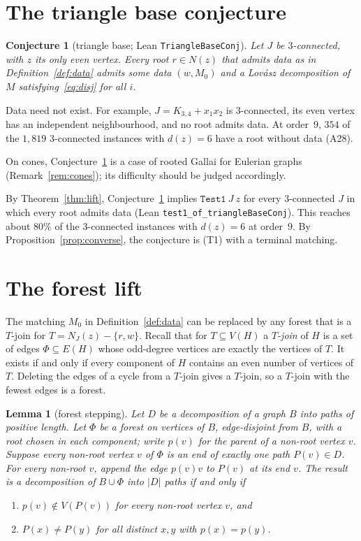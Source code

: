 \documentclass[11pt]{amsart}
\newtheorem{lemma}[theorem]{Lemma}
\newtheorem{conjecture}[theorem]{Conjecture}
\theoremstyle{definition}
\begin{document}
\section{The triangle base conjecture}

\begin{conjecture}[triangle base; Lean \texttt{TriangleBaseConj}]\label{conj:base}
Let $J$ be $3$-connected, with $z$ its only even vertex. Every root $r\in N(z)$ that admits data as in
Definition~\ref{def:data} admits some data $(w,M_0)$ and a Lov\'asz decomposition of $M$
satisfying~\eqref{eq:disj} for all $i$.
\end{conjecture}

Data need not exist. For example, $J=K_{3,4}+x_1x_2$ is $3$-connected, its even vertex has an
independent neighbourhood, and no root admits data. At order~$9$, $354$ of the $1{,}819$
$3$-connected instances with $d(z)=6$ have a root without data (A28).

On cones, Conjecture~\ref{conj:base} is a case of rooted Gallai for Eulerian graphs
(Remark~\ref{rem:cones}); its difficulty should be judged accordingly.

By Theorem~\ref{thm:lift}, Conjecture~\ref{conj:base} implies $\texttt{Test1}\ J\ z$ for every
$3$-connected $J$ in which every root admits data (Lean \texttt{test1\_of\_triangleBaseConj}). This
reaches about $80\%$ of the $3$-connected instances with $d(z)=6$ at order~$9$. By
Proposition~\ref{prop:converse}, the conjecture is (T1) with a terminal matching.

\section{The forest lift}\label{sec:forest}

The matching $M_0$ in Definition~\ref{def:data} can be replaced by any forest that is a $T$-join
for $T=N_J(z)-\{r,w\}$. Recall that for $T\subseteq V(H)$ a \emph{$T$-join} of $H$ is a set of edges
$\Phi\subseteq E(H)$ whose odd-degree vertices are exactly the vertices of $T$. It exists if and only if
every component of $H$ contains an even number of vertices of $T$. Deleting the edges of a cycle from
a $T$-join gives a $T$-join, so a $T$-join with the fewest edges is a forest.

\begin{lemma}[forest stepping]\label{lem:step}
Let $D$ be a decomposition of a graph $B$ into paths of positive length. Let $\Phi$ be a forest on
vertices of $B$, edge-disjoint from $B$, with a root chosen in each component; write $p(v)$ for the
parent of a non-root vertex $v$. Suppose every non-root vertex $v$ of $\Phi$ is an end of exactly one
path $P(v)\in D$. For every non-root $v$, append the edge $p(v)v$ to $P(v)$ at its end $v$. The
result is a decomposition of $B\cup\Phi$ into $|D|$ paths if and only if
\begin{enumerate}[label=(\roman*)]
\item $p(v)\notin V(P(v))$ for every non-root vertex $v$, and
\item $P(x)\ne P(y)$ for all distinct $x,y$ with $p(x)=p(y)$.
\end{enumerate}
\end{lemma}
\end{document}
